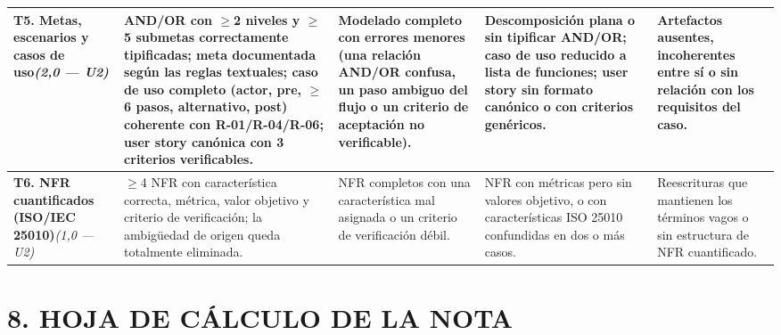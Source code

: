 \documentclass[11pt]{article}
\begin{document}
\begin{landscape}
{\begin{longtable}{|L{3.2cm}|L{5.6cm}|L{5.3cm}|L{4.9cm}|L{4.3cm}|}
\textbf{T5. Metas, escenarios y casos de uso}\newline\textit{(2{,}0 — U2)} &
AND/OR con $\geq$2 niveles y $\geq$5 submetas correctamente tipificadas; meta documentada según las reglas textuales; caso de uso completo (actor, pre, $\geq$6 pasos, alternativo, post) coherente con R-01/R-04/R-06; user story canónica con 3 criterios verificables. &
Modelado completo con errores menores (una relación AND/OR confusa, un paso ambiguo del flujo o un criterio de aceptación no verificable). &
Descomposición plana o sin tipificar AND/OR; caso de uso reducido a lista de funciones; user story sin formato canónico o con criterios genéricos. &
Artefactos ausentes, incoherentes entre sí o sin relación con los requisitos del caso. \\
\hline

\textbf{T6. NFR cuantificados (ISO/IEC 25010)}\newline\textit{(1{,}0 — U2)} &
$\geq$4 NFR con característica correcta, métrica, valor objetivo y criterio de verificación; la ambigüedad de origen queda totalmente eliminada. &
NFR completos con una característica mal asignada o un criterio de verificación débil. &
NFR con métricas pero sin valores objetivo, o con características ISO 25010 confundidas en dos o más casos. &
Reescrituras que mantienen los términos vagos o sin estructura de NFR cuantificado. \\
\hline

\end{longtable}
}
\end{landscape}

\section*{\textcolor{utegreendk}{8. HOJA DE CÁLCULO DE LA NOTA}}
\end{document}

